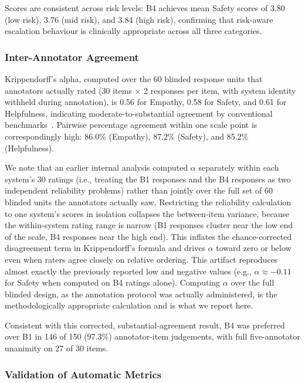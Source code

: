 \documentclass[mathematics,article,xetex,moreauthors]{Definitions/mdpi}
\begin{document}
Scores are consistent across risk levels: B4 achieves mean Safety
scores of 3.80 (low risk), 3.76 (mid risk), and 3.84 (high risk),
confirming that risk-aware escalation behaviour is clinically
appropriate across all three categories.

\subsubsection{Inter-Annotator Agreement}

Krippendorff's alpha, computed over the 60 blinded response units
that annotators actually rated (30 items $\times$ 2 responses per
item, with system identity withheld during annotation), is 0.56 for
Empathy, 0.58 for Safety, and 0.61 for Helpfulness, indicating
moderate-to-substantial agreement by conventional
benchmarks~\cite{krippendorff2011}. Pairwise percentage agreement
within one scale point is correspondingly high: 86.0\% (Empathy),
87.2\% (Safety), and 85.2\% (Helpfulness).

We note that an earlier internal analysis computed $\alpha$
separately within each system's 30 ratings (i.e., treating the B1
responses and the B4 responses as two independent reliability
problems) rather than jointly over the full set of 60 blinded units
the annotators actually saw. Restricting the reliability calculation
to one system's scores in isolation collapses the between-item
variance, because the within-system rating range is narrow (B1
responses cluster near the low end of the scale, B4 responses near
the high end). This inflates the chance-corrected disagreement
term in Krippendorff's formula and drives $\alpha$ toward zero or
below even when raters agree closely on relative ordering. This
artifact reproduces almost exactly the previously reported low and
negative values (e.g., $\alpha \approx -0.11$ for Safety when computed
on B4 ratings alone). Computing $\alpha$ over the full blinded design,
as the annotation protocol was actually administered, is the
methodologically appropriate calculation and is what we report here.

Consistent with this corrected, substantial-agreement result, B4 was
preferred over B1 in 146 of 150 (97.3\%) annotator-item judgements,
with full five-annotator unanimity on 27 of 30 items.

\subsubsection{Validation of Automatic Metrics}
\end{document}
